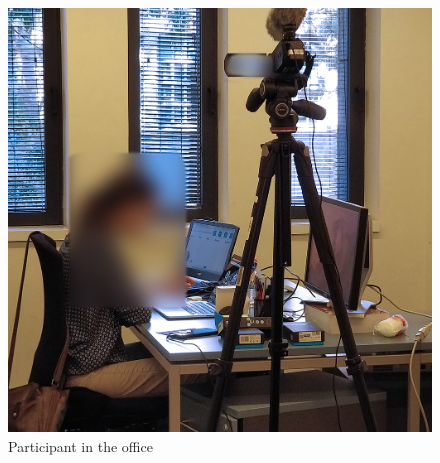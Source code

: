 \begin{figure}[!h]
    \includegraphics[clip,width=\textwidth]{Figures/environment.jpg}%
\caption{Participant in the office}
\label{fig:environment} 
\end{figure}
